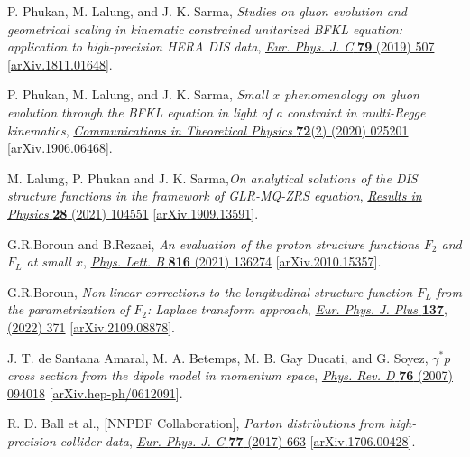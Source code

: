 \documentclass[12pt]{article}
\begin{document}
\begin{thebibliography}{99}
P. Phukan, M. Lalung, and J. K. Sarma, \emph{Studies on gluon evolution and geometrical scaling in kinematic constrained unitarized BFKL equation: application to high-precision HERA DIS data}, \href{https://doi.org/10.1140/epjc/s10052-019-7007-x}{\emph{Eur. Phys. J. C} {\bf 79} (2019) 507} [\href{https://doi.org/10.48550/arXiv.1811.01648}{arXiv.1811.01648}].

P. Phukan, M. Lalung, and J. K. Sarma, \emph{Small $x$ phenomenology on gluon evolution through the BFKL equation in light of a constraint in multi-Regge kinematics}, 
\href{https://doi.org/10.1088/1572-9494/ab61ee}{\emph{Communications in Theoretical Physics} {\bf 72}(2) (2020) 025201} 
[\href{https://doi.org/10.48550/arXiv.1906.06468}{arXiv.1906.06468}].

M. Lalung, P. Phukan and J. K. Sarma,\emph{On analytical solutions of the DIS structure functions in the framework of GLR-MQ-ZRS equation}, \href{https://doi.org/10.1016/j.rinp.2021.104551}{\emph{Results in Physics} {\bf 28} (2021) 104551} [\href{https://doi.org/10.48550/arXiv.1909.13591}{arXiv.1909.13591}].

G.R.Boroun and B.Rezaei, \emph{An evaluation of the proton structure functions $F_2$ and $F_L$ at small $x$}, \href{https://doi.org/10.1016/j.physletb.2021.136274}{\emph{Phys. Lett. B} {\bf 816} (2021) 136274} [\href{https://doi.org/10.48550/arXiv.2010.15357}{arXiv.2010.15357}].

G.R.Boroun, \emph{Non-linear corrections to the longitudinal structure function $F_L$ from the parametrization of $F_2$: Laplace transform approach}, \href{https://doi.org/10.1140/epjp/s13360-022-02558-1}{\emph{ Eur. Phys. J. Plus} {\bf 137}, (2022) 371} [\href{https://doi.org/10.48550/arXiv.2109.08878}{arXiv.2109.08878}].

J. T. de Santana Amaral, M. A. Betemps, M. B. Gay Ducati, and G. Soyez, \emph{$\gamma^{\ast} p$  cross section from the dipole model in momentum space}, \href{https://doi.org/10.1103/PhysRevD.76.094018}{\emph{Phys. Rev. D} {\bf 76} (2007) 094018} [\href{https://doi.org/10.48550/arXiv.hep-ph/0612091}{arXiv.hep-ph/0612091}].

R. D. Ball et al., [NNPDF Collaboration], \emph{Parton distributions from high-precision collider data}, \href{https://doi.org/10.1140/epjc/s10052-017-5199-5}{\emph{Eur. Phys. J. C} {\bf77} (2017) 663} [\href{https://doi.org/10.48550/arXiv.1706.00428}{arXiv.1706.00428}].


\end{thebibliography}
\end{document}

